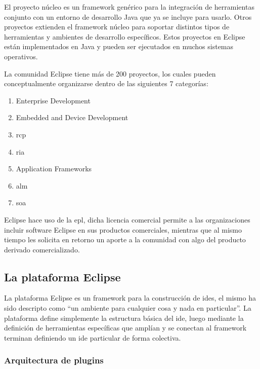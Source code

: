 \documentclass[a4paper,12pt,oneside,spanish]{book}
\begin{document}
El proyecto núcleo es un framework genérico para la integración de herramientas conjunto con un entorno de desarrollo Java que ya se incluye para usarlo. Otros proyectos extienden el framework núcleo para soportar distintos tipos de herramientas y ambientes de desarrollo específicos. Estos proyectos en Eclipse están implementados en Java y pueden ser ejecutados en muchos sistemas operativos.

La comunidad Eclipse tiene más de 200 proyectos, los cuales pueden conceptualmente organizarse dentro de las siguientes 7 categorías:

\begin{enumerate}

\item Enterprise Development

\item Embedded and Device Development

\item \gls{rcp}

\item \gls{ria}

\item Application Frameworks

\item \gls{alm}

\item \gls{soa}

\end{enumerate}

Eclipse hace uso de la \gls{epl}, dicha licencia comercial permite a las organizaciones incluir software Eclipse en sus productos comerciales, mientras que al mismo tiempo les solicita en retorno un aporte a la comunidad con algo del producto derivado comercializado.


\subsection{La plataforma Eclipse}
\label{subsec:PlatEclipse}

La plataforma Eclipse es un framework para la construcción de \glspl{ide}, el mismo ha sido descripto como ``un ambiente para cualquier cosa y nada en particular''. La plataforma define simplemente la estructura básica del \gls{ide}, luego mediante la definición de herramientas específicas que amplían y se conectan al framework terminan definiendo un \gls{ide} particular de forma colectiva.


\subsubsection{Arquitectura de plugins}
\end{document}
